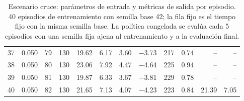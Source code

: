 \begin{table}[H]
\begin{tabular}{rrrrrrrrrrrr}
37 & 0.050 & 79 & 130 & 19.62 & 6.17 & 3.60 & $-$3.73 & 217 & 0.74 & -- & -- \\
38 & 0.050 & 80 & 130 & 23.06 & 7.92 & 4.47 & $-$4.64 & 225 & 0.94 & -- & -- \\
39 & 0.050 & 81 & 130 & 19.87 & 6.33 & 3.67 & $-$3.81 & 229 & 0.78 & -- & -- \\
40 & 0.050 & 82 & 130 & 21.65 & 7.13 & 4.07 & $-$4.23 & 223 & 0.84 & 21.39 & 7.05 \\
\bottomrule
\end{tabular}
\caption[Escenario cruce: episodios de entrenamiento]{Escenario cruce: parámetros de entrada y métricas de salida por episodio. 40 episodios de entrenamiento con semilla base 42; la fila fijo es el tiempo fijo con la misma semilla base. La política congelada se evalúa cada 5 episodios con una semilla fija ajena al entrenamiento y a la evaluación final.}
\label{tab:cruce-episodios}
\end{table}

